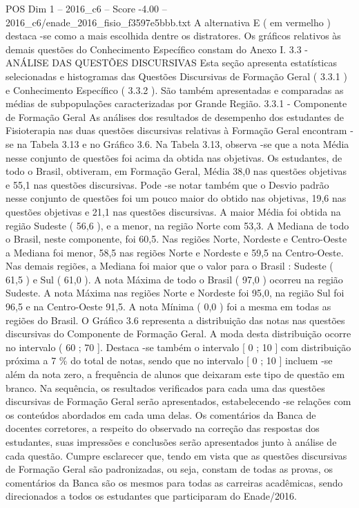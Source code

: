 \begin{textsample}{POS Dim 1 – 2016\_c6 – Score -4.00 – 2016\_c6/enade\_2016\_fisio\_f3597e5bbb.txt}
A alternativa E ( em vermelho ) destaca -se como a mais escolhida dentre os distratores.
Os gráficos relativos às demais questões do Conhecimento Específico constam do Anexo I. 3.3 - ANÁLISE DAS QUESTÕES DISCURSIVAS Esta seção apresenta estatísticas selecionadas e histogramas das Questões Discursivas de Formação Geral ( 3.3.1 ) e Conhecimento Específico ( 3.3.2 ).
São também apresentadas e comparadas as médias de subpopulações caracterizadas por Grande Região. 3.3.1 - Componente de Formação Geral As análises dos resultados de desempenho dos estudantes de Fisioterapia nas duas questões discursivas relativas à Formação Geral encontram -se na Tabela 3.13 e no Gráfico 3.6.
Na Tabela 3.13, observa -se que a nota Média nesse conjunto de questões foi acima da obtida nas objetivas.
Os estudantes, de todo o Brasil, obtiveram, em Formação Geral, Média 38,0 nas questões objetivas e 55,1 nas questões discursivas.
Pode -se notar também que o Desvio padrão nesse conjunto de questões foi um pouco maior do obtido nas objetivas, 19,6 nas questões objetivas e 21,1 nas questões discursivas.
A maior Média foi obtida na região Sudeste ( 56,6 ), e a menor, na região Norte com 53,3.
A Mediana de todo o Brasil, neste componente, foi 60,5.
Nas regiões Norte, Nordeste e Centro-Oeste a Mediana foi menor, 58,5 nas regiões Norte e Nordeste e 59,5 na Centro-Oeste.
Nas demais regiões, a Mediana foi maior que o valor para o Brasil : Sudeste ( 61,5 ) e Sul ( 61,0 ).
A nota Máxima de todo o Brasil ( 97,0 ) ocorreu na região Sudeste.
A nota Máxima nas regiões Norte e Nordeste foi 95,0, na região Sul foi 96,5 e na Centro-Oeste 91,5.
A nota Mínima ( 0,0 ) foi a mesma em todas as regiões do Brasil.
O Gráfico 3.6 representa a distribuição das notas nas questões discursivas do Componente de Formação Geral.
A moda desta distribuição ocorre no intervalo ( 60 ; 70 ].
Destaca -se também o intervalo [ 0 ; 10 ] com distribuição próxima a 7 \% do total de notas, sendo que no intervalo [ 0 ; 10 ] incluem -se além da nota zero, a frequência de alunos que deixaram este tipo de questão em branco.
Na sequência, os resultados verificados para cada uma das questões discursivas de Formação Geral serão apresentados, estabelecendo -se relações com os conteúdos abordados em cada uma delas.
Os comentários da Banca de docentes corretores, a respeito do observado na correção das respostas dos estudantes, suas impressões e conclusões serão apresentados junto à análise de cada questão.
Cumpre esclarecer que, tendo em vista que as questões discursivas de Formação Geral são padronizadas, ou seja, constam de todas as provas, os comentários da Banca são os mesmos para todas as carreiras acadêmicas, sendo direcionados a todos os estudantes que participaram do Enade/2016.

\end{textsample}
